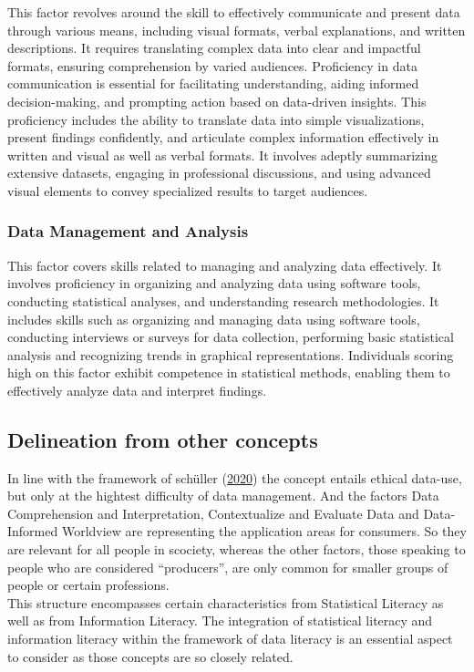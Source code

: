 \documentclass[
  12pt,
  a4paper,
  twoside]{article}
\begin{document}
This factor revolves around the skill to effectively communicate and present data through various means, including visual formats, verbal explanations, and written descriptions.
It requires translating complex data into clear and impactful formats, ensuring comprehension by varied audiences. Proficiency in data communication is essential for facilitating understanding, aiding informed decision-making, and prompting action based on data-driven insights. This proficiency includes the ability to translate data into simple visualizations, present findings confidently, and articulate complex information effectively in written and visual as well as verbal formats. It involves adeptly summarizing extensive datasets, engaging in professional discussions, and using advanced visual elements to convey specialized results to target audiences.

\hypertarget{data-management-and-analysis}{%
\subsubsection{Data Management and Analysis}\label{data-management-and-analysis}}

This factor covers skills related to managing and analyzing data effectively. It involves proficiency in organizing and analyzing data using software tools, conducting statistical analyses, and understanding research methodologies.
It includes skills such as organizing and managing data using software tools, conducting interviews or surveys for data collection, performing basic statistical analysis and recognizing trends in graphical representations. Individuals scoring high on this factor exhibit competence in statistical methods, enabling them to effectively analyze data and interpret findings.

\hypertarget{delineation-from-other-concepts}{%
\subsection{Delineation from other concepts}\label{delineation-from-other-concepts}}

In line with the framework of schüller (\protect\hyperlink{ref-schuxfcller2020}{2020}) the concept entails ethical data-use, but only at the hightest difficulty of data management. And the factors Data Comprehension and Interpretation, Contextualize and Evaluate Data and Data-Informed Worldview are representing the application areas for consumers. So they are relevant for all people in scociety, whereas the other factors, those speaking to people who are considered ``producers'', are only common for smaller groups of people or certain professions.\\
This structure encompasses certain characteristics from Statistical Literacy as well as from Information Literacy.
The integration of statistical literacy and information literacy within the framework of data literacy is an essential aspect to consider as those concepts are so closely related.
\end{document}
